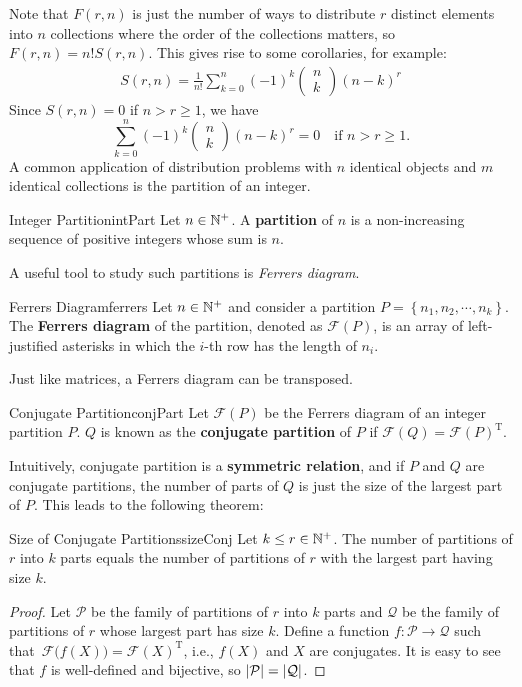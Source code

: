 \documentclass[math]{amznotes}
\theoremstyle{remark}
\begin{document}
Note that $F(r, n)$ is just the number of ways to distribute $r$ distinct elements into $n$ collections where the order of the collections matters, so $F(r, n) = n!S(r, n)$. This gives rise to some corollaries, for example:
\begin{align*}
    S(r, n) =\frac{1}{n!} \sum_{k = 0}^{n}(-1)^k \begin{pmatrix}
        n \\
        k
    \end{pmatrix}(n - k)^r
\end{align*}
Since $S(r, n) = 0$ if $n > r \geq 1$, we have
\begin{equation*}
    \sum_{k = 0}^{n}(-1)^k \begin{pmatrix}
        n \\
        k
    \end{pmatrix}(n - k)^r = 0 \quad \textrm{if }n > r \geq 1.
\end{equation*}
A common application of distribution problems with $n$ identical objects and $m$ identical collections is the partition of an integer.
\begin{dfnbox}{Integer Partition}{intPart}
    Let $n \in \mathbb{N}^+$. A {\color{red} \textbf{partition}} of $n$ is a non-increasing sequence of positive integers whose sum is $n$. 
\end{dfnbox}
A useful tool to study such partitions is \textit{Ferrers diagram}.
\begin{dfnbox}{Ferrers Diagram}{ferrers}
    Let $n \in \mathbb{N}^+$ and consider a partition $P = \left\{n_1, n_2, \cdots, n_k\right\}$. The {\color{red} \textbf{Ferrers diagram}} of the partition, denoted as $\mathcal{F}(P)$, is an array of left-justified asterisks in which the $i$-th row has the length of $n_i$.
\end{dfnbox}
Just like matrices, a Ferrers diagram can be transposed.
\begin{dfnbox}{Conjugate Partition}{conjPart}
    Let $\mathcal{F}(P)$ be the Ferrers diagram of an integer partition $P$. $Q$ is known as the {\color{red} \textbf{conjugate partition}} of $P$ if $\mathcal{F}(Q) = \mathcal{F}(P)^{\mathrm{T}}$.
\end{dfnbox}
Intuitively, conjugate partition is a \textbf{symmetric relation}, and if $P$ and $Q$ are conjugate partitions, the number of parts of $Q$ is just the size of the largest part of $P$. This leads to the following theorem:
\begin{probox}{Size of Conjugate Partitions}{sizeConj}
    Let $k \leq r \in \mathbb{N}^+$. The number of partitions of $r$ into $k$ parts equals the number of partitions of $r$ with the largest part having size $k$.
    \tcblower   
    \begin{proof}
        Let $\mathcal{P}$ be the family of partitions of $r$ into $k$ parts and $\mathcal{Q}$ be the family of partitions of $r$ whose largest part has size $k$. Define a function $f \colon \mathcal{P} \to \mathcal{Q}$ such that~$\mathcal{F}\bigl(f(X)\bigr) = \mathcal{F}(X)^{\mathrm{T}}$, i.e., $f(X)$ and $X$ are conjugates. It is easy to see that $f$ is well-defined and bijective, so ${\left\lvert {\mathcal{P}} \right\rvert} = {\left\lvert {\mathcal{Q}} \right\rvert}$.
    \end{proof}
\end{probox}
\end{document}
